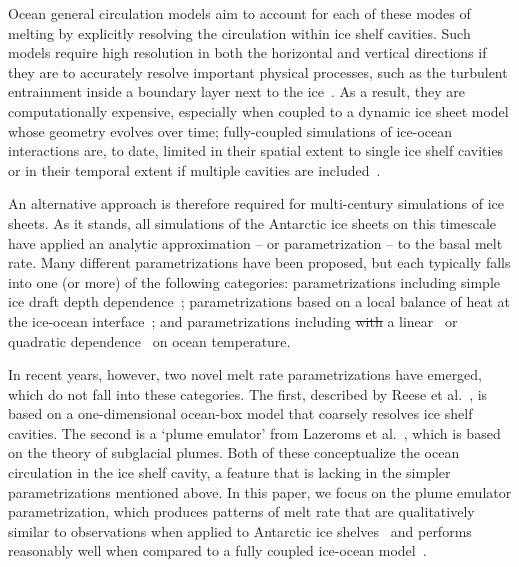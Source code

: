 \documentclass[openacc]{rsproca_new}%
\newcommand{\red}[1]{{\color{red} #1}}
\newcommand{\blue}[1]{{\color{blue} #1}}
\newcommand{\rout}[1]{\red{\st{#1}}}\newcommand{\ab}[1]{\textcolor{Green}{#1}}\newcommand{\about}[1]{\textcolor{Cyan}{\sout{#1}}}
\begin{document}
Ocean general circulation models aim to account for each of these modes of melting by explicitly resolving the circulation within ice shelf cavities. Such models require high resolution in both the horizontal and vertical directions if they are to accurately resolve important physical processes, such as the turbulent entrainment inside a boundary layer next to the ice~\cite[e.g.][]{Kimura2014JPhysOcean}. As a result, they are computationally expensive, especially when coupled to a dynamic ice sheet model whose geometry evolves over time; fully-coupled simulations of ice-ocean interactions are, to date, limited in their spatial extent to single ice shelf cavities~\cite[e.g.][]{DeRydt2016JGeophysResEarthSurf, Seroussi2017GRL} or in their temporal extent if multiple cavities are included~\cite[e.g.][]{Naughten2018JClim}.

An alternative approach is therefore required for multi-century simulations of ice sheets. As it stands, all simulations of the Antarctic ice sheets on this timescale have applied an analytic approximation -- or parametrization -- to the basal melt rate. Many different parametrizations have been proposed, but each typically falls into one (or more) of the following categories: parametrizations including simple ice draft depth dependence~\cite[e.g.][]{Joughin2014Science}; parametrizations based on a local balance of heat at the ice-ocean interface~\cite[e.g][]{Golledge2015Nature}; and parametrizations including \rout{with }a linear~\cite[e.g.][]{Favier2016Cryo} or quadratic dependence~\cite[e.g.][]{Holland2008JClimate} on ocean temperature.

In recent years, however, two novel melt rate parametrizations have emerged, which do not fall into these categories. The first, \blue{ described by Reese et al}.~\cite{Reese2018Cryo}, is based on a one-dimensional ocean-box model that coarsely resolves ice shelf cavities. The second is a `plume emulator' from \blue{Lazeroms et al.}~\cite{Lazeroms2018TheCryo}, which is based on the theory of subglacial plumes. Both of these conceptualize the ocean circulation in the ice shelf cavity, a feature that is lacking in the simpler parametrizations mentioned above. In this paper, we focus on the plume emulator parametrization, which produces patterns of melt rate that are qualitatively similar to observations when applied to Antarctic ice shelves~\cite{Lazeroms2018TheCryo} and performs reasonably well when compared to a fully coupled ice-ocean model~\cite{Favier2019GeosciModDev}.
\end{document}
